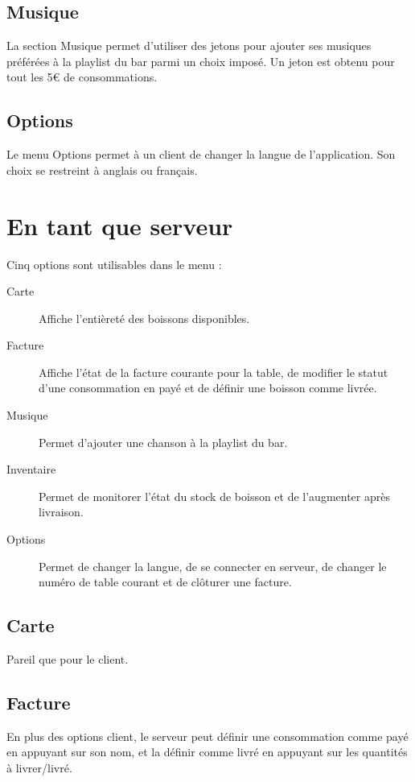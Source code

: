 ﻿\documentclass[a4paper,11pt]{article}
\begin{document}
\subsection{Musique}

La section Musique permet d'utiliser des jetons pour ajouter ses musiques préférées à la playlist du bar parmi un choix imposé. Un jeton est obtenu pour tout les 5\euro{} de consommations.

\subsection{Options}

Le menu Options permet à un client de changer la langue de l'application. Son choix se restreint à anglais ou français.


\pagebreak
\section{En tant que serveur}

Cinq options sont utilisables dans le menu :

\begin{description}
	\item[Carte] Affiche l'entièreté des boissons disponibles.
	\item[Facture] Affiche l'état de la facture courante pour la table, de modifier le statut d'une consommation en payé et de définir une boisson comme livrée.
	\item[Musique] Permet d'ajouter une chanson à la playlist du bar.
	\item[Inventaire] Permet de monitorer l'état du stock de boisson et de l'augmenter après livraison.
	\item[Options] Permet de changer la langue, de se connecter en serveur, de changer le numéro de table courant et de clôturer une facture.
\end{description}

\subsection{Carte}	
Pareil que pour le client.
\subsection{Facture}
En plus des options client, le serveur peut définir une consommation comme payé en appuyant sur son nom, et la définir comme livré en appuyant sur les quantités à livrer/livré.
\end{document}
